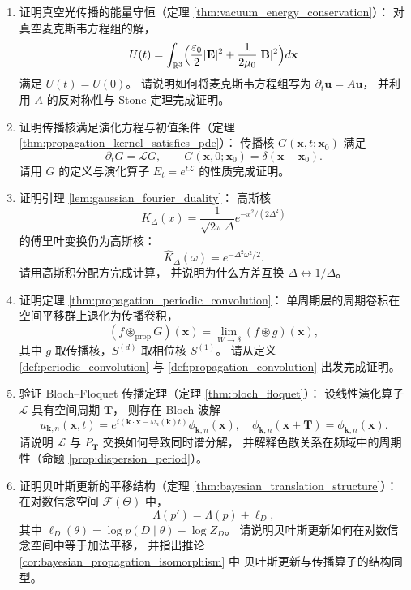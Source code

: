 \begin{enumerate}[leftmargin=3em, label=\textbf{题 \arabic*}]
    \item 证明真空光传播的能量守恒（定理 \ref{thm:vacuum_energy_conservation}）：
    对真空麦克斯韦方程组的解，
    \[
    U(t)=\int_{\mathbb{R}^3}\Bigl(\frac{\varepsilon_0}{2}|\mathbf{E}|^2
    +\frac{1}{2\mu_0}|\mathbf{B}|^2\Bigr)d\mathbf{x}
    \]
    满足 $U(t)=U(0)$。
    请说明如何将麦克斯韦方程组写为 $\partial_t\mathbf{u}=A\mathbf{u}$，
    并利用 $A$ 的反对称性与 Stone 定理完成证明。

    \item 证明传播核满足演化方程与初值条件（定理 \ref{thm:propagation_kernel_satisfies_pde}）：
    传播核 $G(\mathbf{x},t;\mathbf{x}_0)$ 满足
    \[
    \partial_tG=\mathcal{L}G,\qquad
    G(\mathbf{x},0;\mathbf{x}_0)=\delta(\mathbf{x}-\mathbf{x}_0).
    \]
    请用 $G$ 的定义与演化算子 $E_t=e^{t\mathcal{L}}$ 的性质完成证明。

    \item 证明引理 \ref{lem:gaussian_fourier_duality}：
    高斯核
    \[
    K_\Delta(x)=\frac{1}{\sqrt{2\pi}\Delta}e^{-x^2/(2\Delta^2)}
    \]
    的傅里叶变换仍为高斯核：
    \[
    \hat{K}_\Delta(\omega)=e^{-\Delta^2\omega^2/2}.
    \]
    请用高斯积分配方完成计算，
    并说明为什么方差互换 $\Delta\leftrightarrow1/\Delta$。

    \item 证明定理 \ref{thm:propagation_periodic_convolution}：
    单周期层的周期卷积在空间平移群上退化为传播卷积，
    \[
    (f\circledast_{\text{prop}}G)(\mathbf{x})
    =\lim_{W\to\delta}(f\circledast g)(\mathbf{x}),
    \]
    其中 $g$ 取传播核，$S^{(d)}$ 取相位核 $S^{(1)}$。
    请从定义 \ref{def:periodic_convolution} 与 \ref{def:propagation_convolution} 出发完成证明。

    \item 验证 Bloch--Floquet 传播定理（定理 \ref{thm:bloch_floquet}）：
    设线性演化算子 $\mathcal{L}$ 具有空间周期 $\mathbf{T}$，
    则存在 Bloch 波解
    \[
    u_{\mathbf{k},n}(\mathbf{x},t)
    =e^{i(\mathbf{k}\cdot\mathbf{x}-\omega_n(\mathbf{k})t)}\phi_{\mathbf{k},n}(\mathbf{x}),
    \quad
    \phi_{\mathbf{k},n}(\mathbf{x}+\mathbf{T})=\phi_{\mathbf{k},n}(\mathbf{x}).
    \]
    请说明 $\mathcal{L}$ 与 $P_{\mathbf{T}}$ 交换如何导致同时谱分解，
    并解释色散关系在频域中的周期性（命题 \ref{prop:dispersion_period}）。

    \item 证明贝叶斯更新的平移结构（定理 \ref{thm:bayesian_translation_structure}）：
    在对数信念空间 $\mathcal{F}(\Theta)$ 中，
    \[
    \Lambda(p')=\Lambda(p)+\ell_D,
    \]
    其中 $\ell_D(\theta)=\log p(D\mid\theta)-\log Z_D$。
    请说明贝叶斯更新如何在对数信念空间中等于加法平移，
    并指出推论 \ref{cor:bayesian_propagation_isomorphism} 中
    贝叶斯更新与传播算子的结构同型。


\end{enumerate}
